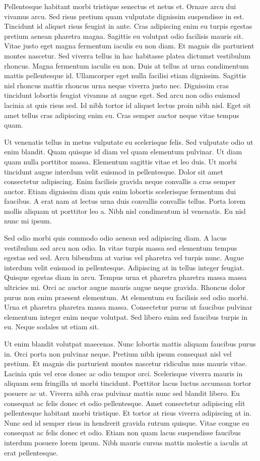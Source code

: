 \documentclass[11pt,a4paper]{article}
\begin{document}
Pellentesque habitant morbi tristique senectus et netus et. Ornare arcu dui vivamus arcu. Sed risus pretium quam vulputate dignissim suspendisse in est. Tincidunt id aliquet risus feugiat in ante. Cras adipiscing enim eu turpis egestas pretium aenean pharetra magna. Sagittis eu volutpat odio facilisis mauris sit. Vitae justo eget magna fermentum iaculis eu non diam. Et magnis dis parturient montes nascetur. Sed viverra tellus in hac habitasse platea dictumst vestibulum rhoncus. Magna fermentum iaculis eu non. Duis at tellus at urna condimentum mattis pellentesque id. Ullamcorper eget nulla facilisi etiam dignissim. Sagittis nisl rhoncus mattis rhoncus urna neque viverra justo nec. Dignissim cras tincidunt lobortis feugiat vivamus at augue eget. Sed arcu non odio euismod lacinia at quis risus sed. Id nibh tortor id aliquet lectus proin nibh nisl. Eget sit amet tellus cras adipiscing enim eu. Cras semper auctor neque vitae tempus quam.

Ut venenatis tellus in metus vulputate eu scelerisque felis. Sed vulputate odio ut enim blandit. Quam quisque id diam vel quam elementum pulvinar. Ut diam quam nulla porttitor massa. Elementum sagittis vitae et leo duis. Ut morbi tincidunt augue interdum velit euismod in pellentesque. Dolor sit amet consectetur adipiscing. Enim facilisis gravida neque convallis a cras semper auctor. Etiam dignissim diam quis enim lobortis scelerisque fermentum dui faucibus. A erat nam at lectus urna duis convallis convallis tellus. Porta lorem mollis aliquam ut porttitor leo a. Nibh nisl condimentum id venenatis. Eu nisl nunc mi ipsum.

Sed odio morbi quis commodo odio aenean sed adipiscing diam. A lacus vestibulum sed arcu non odio. In vitae turpis massa sed elementum tempus egestas sed sed. Arcu bibendum at varius vel pharetra vel turpis nunc. Augue interdum velit euismod in pellentesque. Adipiscing at in tellus integer feugiat. Quisque egestas diam in arcu. Tempus urna et pharetra pharetra massa massa ultricies mi. Orci ac auctor augue mauris augue neque gravida. Rhoncus dolor purus non enim praesent elementum. At elementum eu facilisis sed odio morbi. Urna et pharetra pharetra massa massa. Consectetur purus ut faucibus pulvinar elementum integer enim neque volutpat. Sed libero enim sed faucibus turpis in eu. Neque sodales ut etiam sit.

Ut enim blandit volutpat maecenas. Nunc lobortis mattis aliquam faucibus purus in. Orci porta non pulvinar neque. Pretium nibh ipsum consequat nisl vel pretium. Et magnis dis parturient montes nascetur ridiculus mus mauris vitae. Lacinia quis vel eros donec ac odio tempor orci. Scelerisque viverra mauris in aliquam sem fringilla ut morbi tincidunt. Porttitor lacus luctus accumsan tortor posuere ac ut. Viverra nibh cras pulvinar mattis nunc sed blandit libero. Eu consequat ac felis donec et odio pellentesque. Amet consectetur adipiscing elit pellentesque habitant morbi tristique. Et tortor at risus viverra adipiscing at in. Nunc sed id semper risus in hendrerit gravida rutrum quisque. Vitae congue eu consequat ac felis donec et odio. Etiam non quam lacus suspendisse faucibus interdum posuere lorem ipsum. Nibh mauris cursus mattis molestie a iaculis at erat pellentesque.
\end{document}
